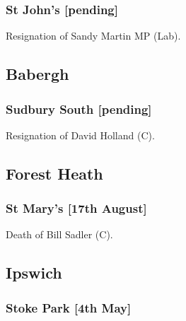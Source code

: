 \documentclass[a4paper,openany]{book}
\begin{document}
\begin{resultsiii}
\subsubsection*{St John's \hspace*{\fill}\nolinebreak[1]%
\enspace\hspace*{\fill}
[pending]}


Resignation of Sandy Martin MP (Lab).

\subsection*{Babergh}

\subsubsection*{Sudbury South \hspace*{\fill}\nolinebreak[1]%
\enspace\hspace*{\fill}
[pending]}


Resignation of David Holland (C).

\subsection*{Forest Heath}

\subsubsection*{St Mary's \hspace*{\fill}\nolinebreak[1]%
\enspace\hspace*{\fill}
[17th August]}


Death of Bill Sadler (C).

\subsection*{Ipswich}

\subsubsection*{Stoke Park \hspace*{\fill}\nolinebreak[1]%
\enspace\hspace*{\fill}
[4th May]}


\end{resultsiii}
\end{document}
